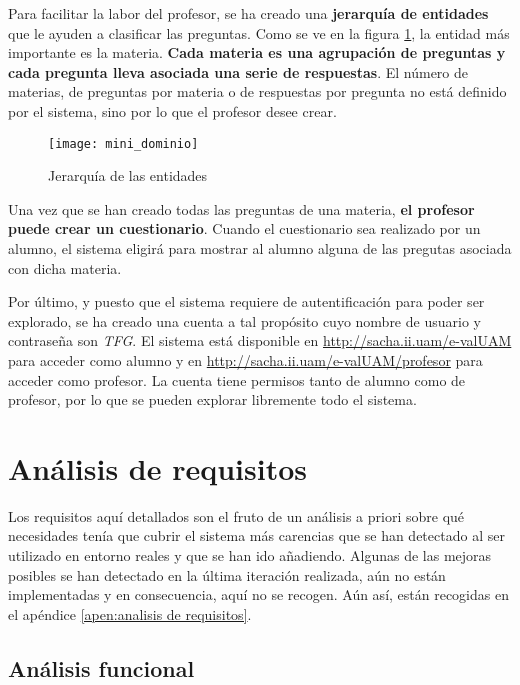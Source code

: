 Para facilitar la labor del profesor, se ha creado una \textbf{jerarquía de entidades} que le ayuden a clasificar las preguntas. Como se ve en la figura \ref{fig:mini dominio}, la entidad más importante es la materia. \textbf{Cada materia es una agrupación de preguntas y cada pregunta lleva asociada una serie de respuestas}. El número de materias, de preguntas por materia o de respuestas por pregunta no está definido por el sistema, sino por lo que el profesor desee crear.

\begin{figure}[htp!]
	\centering
	\texttt{[image: mini\_dominio]}
	\caption{Jerarquía de las entidades}
	\label{fig:mini dominio}
\end{figure}

Una vez que se han creado todas las preguntas de una materia, \textbf{el profesor puede crear un cuestionario}. Cuando el cuestionario sea realizado por un alumno, el sistema eligirá para mostrar al alumno alguna de las pregutas asociada con dicha materia.

Por último, y puesto que el sistema requiere de autentificación para poder ser explorado, se ha creado una cuenta a tal propósito cuyo nombre de usuario y contraseña son \textit{TFG}. El sistema está disponible en \url{http://sacha.ii.uam/e-valUAM} para acceder como alumno y en \url{http://sacha.ii.uam/e-valUAM/profesor} para acceder como profesor. La cuenta tiene permisos tanto de alumno como de profesor, por lo que se pueden explorar libremente todo el sistema.




\section{Análisis de requisitos}

Los requisitos aquí detallados son el fruto de un análisis a priori sobre qué necesidades tenía que cubrir el sistema más carencias que se han detectado al ser utilizado en entorno reales y que se han ido añadiendo. Algunas de las mejoras posibles se han detectado en la última iteración realizada, aún no están implementadas y en consecuencia, aquí no se recogen. Aún así, están recogidas en el apéndice \ref{apen:analisis de requisitos}. 

\subsection{Análisis funcional}

